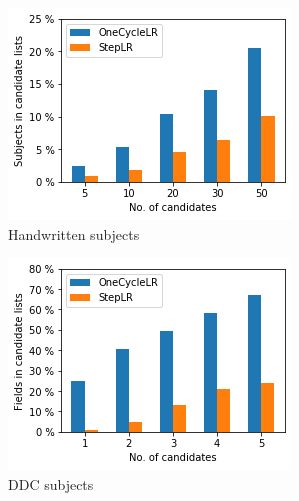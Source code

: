 \begin{figure}
  \begin{subfigure}[t]{.32\textwidth}
    \centering
    \includegraphics[width=\textwidth]{figures/supervised_approach/scheduler_hw.png}
    \caption{Handwritten subjects}
    \label{fig:scheduler_hw}
  \end{subfigure}
  \begin{subfigure}[t]{.32\textwidth}
    \centering
    \includegraphics[width=\textwidth]{figures/supervised_approach/scheduler_ddc.png}
    \caption{DDC subjects}
    \label{fig:scheduler_ddc}
  \end{subfigure}
   \begin{subfigure}[t]{.32\textwidth}
    \centering

\end{subfigure}
\end{figure}
